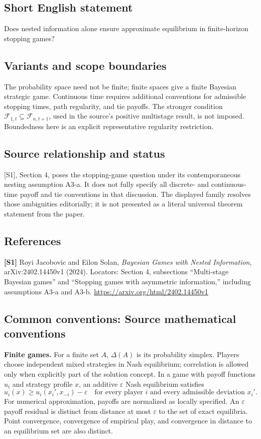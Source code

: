 \documentclass[11pt,a4paper]{article}
\begin{document}
\subsection*{Short English statement}
Does nested information alone ensure approximate equilibrium in finite-horizon stopping games?
\subsection*{Variants and scope boundaries}
The probability space need not be finite; finite spaces give a finite Bayesian strategic game. Continuous time requires additional conventions for admissible stopping times, path regularity, and tie payoffs. The stronger condition $\mathcal F_{1,t}\subseteq\mathcal F_{n,t+1}$, used in the source's positive multistage result, is not imposed. Boundedness here is an explicit representative regularity restriction.
\subsection*{Source relationship and status}
[S1], Section 4, poses the stopping-game question under its contemporaneous nesting assumption A3-a. It does not fully specify all discrete- and continuous-time payoff and tie conventions in that discussion. The displayed family resolves those ambiguities editorially; it is not presented as a literal universal theorem statement from the paper.
\subsection*{References}
\begingroup\footnotesize\raggedright
\textbf{[S1]} Royi Jacobovic and Eilon Solan, \emph{Bayesian Games with Nested Information}, arXiv:2402.14450v1 (2024). Locators: Section 4, subsections ``Multi-stage Bayesian games'' and ``Stopping games with asymmetric information,'' including assumptions A3-a and A3-b. \url{https://arxiv.org/html/2402.14450v1}
\par\endgroup

\subsection*{Common conventions: Source mathematical conventions}

\textbf{Finite games.} For a finite set $A$, $\Delta(A)$ is its probability
simplex. Players choose independent mixed strategies in Nash equilibrium;
correlation is allowed only when explicitly part of the solution concept.
In a game with payoff functions $u_i$ and strategy profile $x$, an additive
$\varepsilon$ Nash equilibrium satisfies
\[
 u_i(x)\geq u_i(x_i',x_{-i})-\varepsilon
 \quad\text{for every player $i$ and every admissible deviation $x_i'$}.
\]
For numerical approximation, payoffs are normalized as locally specified.
An $\varepsilon$ payoff residual is distinct from distance at most
$\varepsilon$ to the set of exact equilibria. Point convergence, convergence
of empirical play, and convergence in distance to an equilibrium set are
also distinct.
\end{document}
